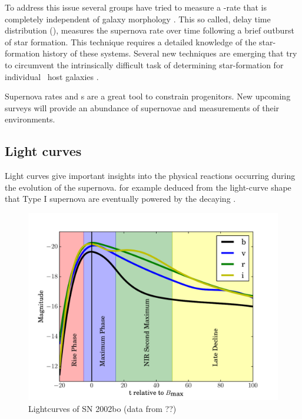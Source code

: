 To address this issue several groups have tried to measure a \sneia-rate that is completely independent of galaxy morphology \citep[e.g.][]{2006MNRAS.370..773M, 2010ApJ...722.1879M}. This so called, delay time distribution (\dtd), measures the supernova rate over time following a brief outburst of star formation.
This technique requires a detailed knowledge of the star-formation history of these systems. Several new techniques are emerging that try to circumvent the intrinsically difficult task of determining star-formation for individual \sneia\ host galaxies \citep{2010MNRAS.407.1314M, 2010arXiv1010.5786B, 2008PASJ...60.1327T, 2010ApJ...722.1879M}.

Supernova rates and \dtd s are a great tool to constrain progenitors. New upcoming surveys will provide an abundance of supernovae and measurements of their environments.

\subsection{Light curves} 
\label{sec:intro_lc}
Light curves give important insights into the physical reactions occurring during the evolution of the supernova. \cite{1982ApJ...253..785A} for example deduced from the light-curve shape that Type I supernova are eventually powered by the decaying \Co. 


\begin{figure}[htb] %
   \centering
   \includegraphics[width=\textwidth]{chapter_intro/plots/lightcurve_2002bo.pdf} 
   \caption{Lightcurves of SN 2002bo (data from ??)}
   \label{fig:lightcurve_2002bo}
\end{figure}

